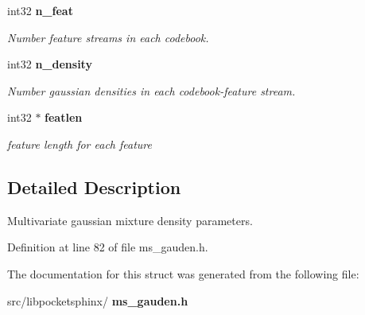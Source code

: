 \begin{DoxyCompactItemize}
\mbox{\label{structgauden__t_a6dea221962b4a278dbae4806925a7be0}} 
int32 \textbf{ n\+\_\+feat}
\begin{DoxyCompactList}\small\item\em Number feature streams in each codebook. \end{DoxyCompactList}\item 
\mbox{\label{structgauden__t_ab5104d8fa59bc94b12b36104dd4c19ac}} 
int32 \textbf{ n\+\_\+density}
\begin{DoxyCompactList}\small\item\em Number gaussian densities in each codebook-\/feature stream. \end{DoxyCompactList}\item 
\mbox{\label{structgauden__t_aca099d830de926e628ac0b523046b32c}} 
int32 $\ast$ \textbf{ featlen}
\begin{DoxyCompactList}\small\item\em feature length for each feature \end{DoxyCompactList}\end{DoxyCompactItemize}


\subsection{Detailed Description}
Multivariate gaussian mixture density parameters. 

Definition at line 82 of file ms\+\_\+gauden.\+h.



The documentation for this struct was generated from the following file\+:\begin{DoxyCompactItemize}
\item 
src/libpocketsphinx/\textbf{ ms\+\_\+gauden.\+h}\end{DoxyCompactItemize}
